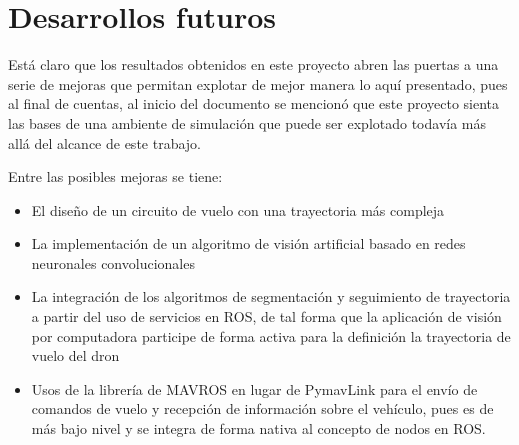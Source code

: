 \section{Desarrollos futuros}

Está claro que los resultados obtenidos en este proyecto abren las puertas a una serie de mejoras que permitan explotar de mejor manera lo aquí presentado, pues al final de cuentas, al inicio del documento se mencionó que este proyecto sienta las bases de una ambiente de simulación que puede ser explotado todavía más allá del alcance de este trabajo. 

Entre las posibles mejoras se tiene:

\begin{itemize}
    \item El diseño de un circuito de vuelo con una trayectoria más compleja
    \item La implementación de un algoritmo de visión artificial basado en redes neuronales convolucionales
    \item La integración de los algoritmos de segmentación y seguimiento de trayectoria a partir del uso de servicios en ROS, de tal forma que la aplicación de visión por computadora participe de forma activa para la definición la trayectoria de vuelo del dron
    \item Usos de la librería de MAVROS en lugar de PymavLink para el envío de comandos de vuelo y recepción de información sobre el vehículo, pues es de más bajo nivel y se integra de forma nativa al concepto de nodos en ROS.
\end{itemize}